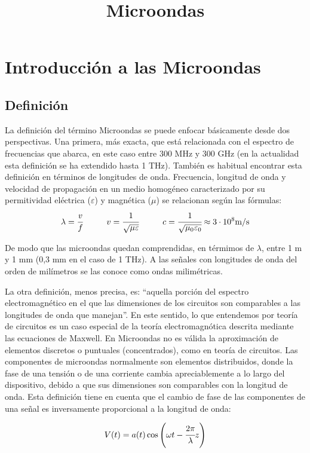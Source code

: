 \documentclass[12pt]{article}
\title{Microondas}
\begin{document}
\tableofcontents
\newpage

\section{Introducci\'on a las Microondas}
\subsection{Definici\'on}
La definici\'on del t\'ermino Microondas se puede enfocar b\'asicamente desde dos perspectivas. Una primera, m\'as exacta, que est\'a relacionada con el espectro de frecuencias que abarca, en este caso entre 300 MHz y 300 GHz (en la actualidad esta definici\'on se ha extendido hasta 1 THz). Tambi\'en es habitual encontrar esta definici\'on en t\'erminos de longitudes de onda. Frecuencia, longitud de onda y velocidad de propagaci\'on en un medio homog\'eneo caracterizado por su permitividad el\'ectrica ($\varepsilon$) y magn\'etica ($\mu$) se relacionan seg\'un las f\'ormulas:
$$\lambda = \cfrac{v}{f} \hspace{1cm} v=\cfrac{1}{\sqrt{\mu\varepsilon}} \hspace{1cm} c=\cfrac{1}{\sqrt{\mu_0\varepsilon_0}} \approx 3 \cdot 10^8 \text{m/s} $$

De modo que las microondas quedan comprendidas, en t\'ermimos de $\lambda$, entre 1 m y 1 mm (0,3 mm en el caso de 1 THz). A las se\~nales con longitudes de onda del orden de mil\'imetros se las conoce como ondas milim\'etricas.

\vspace{0.4cm}
La otra definici\'on, menos precisa, es: ``aquella porci\'on del espectro electromagn\'etico en el que las dimensiones de los circuitos son comparables a las longitudes de onda que manejan''. En este sentido, lo que entendemos por teor\'ia de circuitos es un caso especial de la teor\'ia electromagn\'otica descrita mediante las ecuaciones de Maxwell. En Microondas no es v\'alida la aproximaci\'on de elementos discretos o puntuales (concentrados), como en teor\'ia de circuitos. Las componentes de microondas normalmente son elementos distribuidos, donde la fase de una tensi\'on o de una corriente cambia apreciablemente a lo largo del dispositivo, debido a que sus dimensiones son comparables con la longitud de onda. Esta definici\'on tiene en cuenta que el cambio de fase de las componentes de una se\~nal es inversamente proporcional a la longitud de onda:

$$V(t) = a(t) \cos\left(\omega t -\cfrac{2\pi}{\lambda}z\right)$$
\end{document}
